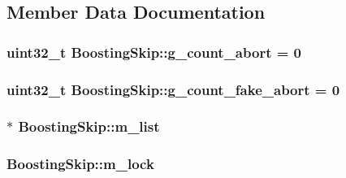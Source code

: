 \subsection{Member Data Documentation}
\hypertarget{classBoostingSkip_a17bca8f2a8c84c6c1b5e1ffba1c56aa9}{
\subsubsection[{g\-\_\-count\-\_\-abort}]{\setlength{\rightskip}{0pt plus 5cm}uint32\-\_\-t Boosting\-Skip\-::g\-\_\-count\-\_\-abort = 0\hspace{0.3cm}{\ttfamily [private]}}}\label{classBoostingSkip_a17bca8f2a8c84c6c1b5e1ffba1c56aa9}
\hypertarget{classBoostingSkip_a46890100a3061a09a075cbccf10b1e86}{
\subsubsection[{g\-\_\-count\-\_\-fake\-\_\-abort}]{\setlength{\rightskip}{0pt plus 5cm}uint32\-\_\-t Boosting\-Skip\-::g\-\_\-count\-\_\-fake\-\_\-abort = 0\hspace{0.3cm}{\ttfamily [private]}}}\label{classBoostingSkip_a46890100a3061a09a075cbccf10b1e86}
\hypertarget{classBoostingSkip_a900906c2e377dd0687acce9946c449db}{
\subsubsection[{m\-\_\-list}]{$\ast$ Boosting\-Skip\-::m\-\_\-list\hspace{0.3cm}{\ttfamily [private]}}}\label{classBoostingSkip_a900906c2e377dd0687acce9946c449db}
\hypertarget{classBoostingSkip_af69c8fcaf2f40ff82432e9d35f9dd28a}{
\subsubsection[{m\-\_\-lock}]{ Boosting\-Skip\-::m\-\_\-lock\hspace{0.3cm}{\ttfamily [private]}}}\label{classBoostingSkip_af69c8fcaf2f40ff82432e9d35f9dd28a}
